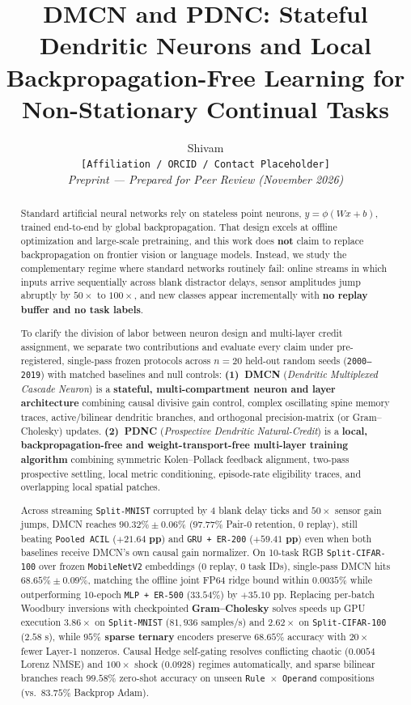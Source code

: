 \documentclass[11pt,a4paper]{article}
\title{\vspace{-1.0em}\Large\bfseries DMCN and PDNC: Stateful Dendritic Neurons and Local Backpropagation-Free Learning for Non-Stationary Continual Tasks}
\author{Shivam \\[0.25em]
\small\texttt{[Affiliation / ORCID / Contact Placeholder]} \\[0.15em]
\small\textit{Preprint --- Prepared for Peer Review (November 2026)}}
\date{}
\begin{document}
\maketitle
\thispagestyle{empty}

\begin{abstract}
\noindent Standard artificial neural networks rely on stateless point neurons, $y = \phi(Wx + b)$, trained end-to-end by global backpropagation. That design excels at offline optimization and large-scale pretraining, and this work does \textbf{not} claim to replace backpropagation on frontier vision or language models. Instead, we study the complementary regime where standard networks routinely fail: online streams in which inputs arrive sequentially across blank distractor delays, sensor amplitudes jump abruptly by $50\times$ to $100\times$, and new classes appear incrementally with \textbf{no replay buffer and no task labels}.

To clarify the division of labor between neuron design and multi-layer credit assignment, we separate two contributions and evaluate every claim under pre-registered, single-pass frozen protocols across $n = 20$ held-out random seeds (\texttt{2000--2019}) with matched baselines and null controls:
\textbf{(1)~DMCN} (\textit{Dendritic Multiplexed Cascade Neuron}) is a \textbf{stateful, multi-compartment neuron and layer architecture} combining causal divisive gain control, complex oscillating spine memory traces, active/bilinear dendritic branches, and orthogonal precision-matrix (or Gram--Cholesky) updates.
\textbf{(2)~PDNC} (\textit{Prospective Dendritic Natural-Credit}) is a \textbf{local, backpropagation-free and weight-transport-free multi-layer training algorithm} combining symmetric Kolen--Pollack feedback alignment, two-pass prospective settling, local metric conditioning, episode-rate eligibility traces, and overlapping local spatial patches.

Across streaming \texttt{Split-MNIST} corrupted by $4$ blank delay ticks and $50\times$ sensor gain jumps, DMCN reaches \textbf{$90.32\% \pm 0.06\%$} ($97.77\%$ Pair-0 retention, $0$ replay), still beating \texttt{Pooled ACIL} ($\mathbf{+21.64\text{ pp}}$) and \texttt{GRU + ER-200} ($\mathbf{+59.41\text{ pp}}$) even when both baselines receive DMCN's own causal gain normalizer. On 10-task RGB \texttt{Split-CIFAR-100} over frozen \texttt{MobileNetV2} embeddings ($0$ replay, $0$ task IDs), single-pass DMCN hits \textbf{$68.65\% \pm 0.09\%$}, matching the offline joint FP64 ridge bound within $0.0035\%$ while outperforming 10-epoch \texttt{MLP + ER-500} ($33.54\%$) by $+35.10\text{ pp}$. Replacing per-batch Woodbury inversions with checkpointed \textbf{Gram--Cholesky} solves speeds up GPU execution \textbf{$3.86\times$} on \texttt{Split-MNIST} ($81{,}936$ samples/s) and \textbf{$2.62\times$} on \texttt{Split-CIFAR-100} ($2.58\text{ s}$), while \textbf{$95\%$ sparse ternary} encoders preserve $68.65\%$ accuracy with $20\times$ fewer Layer-1 nonzeros. Causal Hedge self-gating resolves conflicting chaotic ($0.0054$ Lorenz NMSE) and $100\times$ shock ($0.0928$) regimes automatically, and sparse bilinear branches reach \textbf{$99.58\%$} zero-shot accuracy on unseen \texttt{Rule $\times$ Operand} compositions (vs.\ $83.75\%$ Backprop Adam).


\end{abstract}
\end{document}
